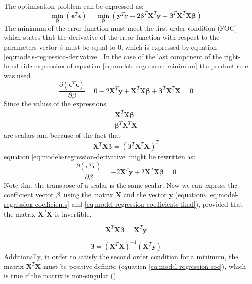 The optimisation problem can be expressed as:
\begin{equation}\label{eq:models-regression-minimum}
    \min_{\bm{\beta}} (\bm{\epsilon}^T \bm{\epsilon}) = \min_{\bm{\beta}} (\bm{y}^T \bm{y} - 2\bm{\beta}^T \bm{X}^T \bm{y} + \bm{\beta}^T \bm{X}^T \bm{X \beta})
\end{equation}
The minimum of the error function must meet the first-order condition (FOC) which states that the derivative of the error function with respect to the parameters vector $\beta$ must be equal to 0, which is expressed by equation \ref{eq:models-regression-derivative}. In the case of the last component of the right-hand side expression of equation \ref{eq:models-regression-minimum} the product rule was used.
\begin{equation}\label{eq:models-regression-derivative}
    \frac{\partial{(\bm{\epsilon}^T \bm{\epsilon})}}{\partial{\beta}} = 0 - 2 \bm{X}^T \bm{y} + \bm{X}^T\bm{X}\bm{\beta} + \bm{\beta}^T\bm{X}^T\bm{X} = 0
\end{equation}
Since the values of the expressions
\begin{align}
 \bm{X}^T\bm{X}\bm{\beta} \\
 \bm{\beta}^T\bm{X}^T\bm{X}
\end{align}
are scalars and because of the fact that
\begin{equation}
 \bm{X}^T\bm{X}\bm{\beta} = (\bm{\beta}^T\bm{X}^T\bm{X})^T
\end{equation}
equation \ref{eq:models-regression-derivative} might be rewritten as:
\begin{equation}
    \frac{\partial{(\bm{\epsilon}^T \bm{\epsilon})}}{\partial{\beta}} = -2 \bm{X}^T \bm{y} + 2\bm{X}^T\bm{X}\bm{\beta} = 0
\end{equation}
Note that the transpose of a scalar is the same scalar. Now we can express the coefficient vector $\beta$, using the matrix $\bm{X}$ and the vector $\bm{y}$ (equations \ref{eq:model-regression-coefficients} and \ref{eq:model-regression-coefficients-final}), provided that the matrix $\bm{X}^T\bm{X}$ is invertible.

\begin{equation}\label{eq:model-regression-coefficients}
  \bm{X}^T\bm{X}\bm{\beta} = \bm{X}^T \bm{y}
\end{equation}

\begin{equation}\label{eq:model-regression-coefficients-final}
  \bm{\beta} = (\bm{X}^T\bm{X})^{-1} (\bm{X}^T \bm{y})
\end{equation}
Additionally, in order to satisfy the second order condition for a minimum, the matrix $\bm{X}^T\bm{X}$ must be positive definite (equation \ref{eq:model-regression-soc}), which is true if the matrix is non-singular (\cite{LAI2008}).

